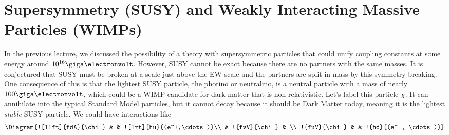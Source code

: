 \documentclass[a4paper,twoside,master.tex]{subfiles}
\begin{document}

\section{Supersymmetry (SUSY) and Weakly Interacting Massive Particles (WIMPs)}\label{sec:supersymmetry_(susy)_and_weakly_interacting_massive_particles_(wimps)}

In the previous lecture, we discussed the possibility of a theory with supersymmetric particles that could unify coupling constants at some energy around $ 10^{16} \giga\electronvolt $. However, SUSY cannot be exact because there are no partners with the same masses. It is conjectured that SUSY must be broken at a scale just above the EW scale and the partners are split in mass by this symmetry breaking. One consequence of this is that the lightest SUSY particle, the photino or neutralino, is a neutral particle with a mass of nearly $ 100 \giga\electronvolt $, which could be a WIMP candidate for dark matter that is non-relativistic. Let's label this particle $ \chi $. It can annihilate into the typical Standard Model particles, but it cannot decay because it should be Dark Matter today, meaning it is the lightest \textit{stable} SUSY particle. We could have interactions like
\begin{equation}
    \Diagram{![llft]{fdA}{\chi} & & ![lrt]{hu}{(e^+,\cdots)}\\ & !{fvV}{\chi} & \\ !{fuV}{\chi} & & !{hd}{(e^-, \cdots)}}
\end{equation}
\end{document}
